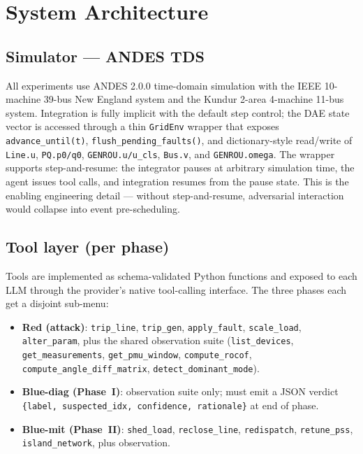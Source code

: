 \documentclass[journal,twocolumn,10pt]{IEEEtran}
\begin{document}
\section{System Architecture}
\label{sec:arch}

\subsection{Simulator --- ANDES TDS}
All experiments use ANDES 2.0.0 time-domain simulation with the IEEE 10-machine 39-bus New England system and the Kundur 2-area 4-machine 11-bus system. Integration is fully implicit with the default step control; the DAE state vector is accessed through a thin \texttt{GridEnv} wrapper that exposes \texttt{advance\_until(t)}, \texttt{flush\_pending\_faults()}, and dictionary-style read/write of \texttt{Line.u}, \texttt{PQ.p0/q0}, \texttt{GENROU.u/u\_cls}, \texttt{Bus.v}, and \texttt{GENROU.omega}. The wrapper supports step-and-resume: the integrator pauses at arbitrary simulation time, the agent issues tool calls, and integration resumes from the pause state. This is the enabling engineering detail --- without step-and-resume, adversarial interaction would collapse into event pre-scheduling.

\subsection{Tool layer (per phase)}
Tools are implemented as schema-validated Python functions and exposed to each LLM through the provider's native tool-calling interface. The three phases each get a disjoint sub-menu:
\begin{itemize}
\item \textbf{Red (attack)}: \texttt{trip\_line}, \texttt{trip\_gen}, \texttt{apply\_fault}, \texttt{scale\_load}, \texttt{alter\_param}, plus the shared observation suite (\texttt{list\_devices}, \texttt{get\_measurements}, \texttt{get\_pmu\_window}, \texttt{compute\_rocof}, \texttt{compute\_angle\_diff\_matrix}, \texttt{detect\_dominant\_mode}).
\item \textbf{Blue-diag (Phase~I)}: observation suite only; must emit a JSON verdict \texttt{\{label, suspected\_idx, confidence, rationale\}} at end of phase.
\item \textbf{Blue-mit (Phase~II)}: \texttt{shed\_load}, \texttt{reclose\_line}, \texttt{redispatch}, \texttt{retune\_pss}, \texttt{island\_network}, plus observation.
\end{itemize}
\end{document}
